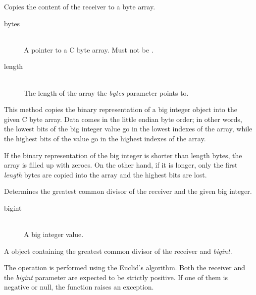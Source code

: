 
Copies the content of the receiver to a byte array.


\docparams

\begin{description}
\item[bytes] \hfill \\ A pointer to a C byte array. Must not be .
\item[length] \hfill \\ The length of the array the \emph{bytes} parameter points to.
\end{description}

\docdiscuss

This method copies the binary representation of a big integer object into the given C byte array. Data comes in the little endian byte order; in other words, the lowest bits of the big integer value go in the lowest indexes of the array, while the highest bits of the value go in the highest indexes of the array.

If the binary representation of the big integer is shorter than length bytes, the array is filled up with zeroes. On the other hand, if it is longer, only the first \emph{length} bytes are copied into the array and the highest bits are lost.



Determines the greatest common divisor of the receiver and the given big integer.


\docparams

\begin{description}
\item[bigint] \hfill \\ A big integer value.
\end{description}

\docretval

A  object containing the greatest common divisor of the receiver and \emph{bigint}.

\docdiscuss

The operation is performed using the Euclid's algorithm. Both the receiver and the \emph{bigint} parameter are expected to be strictly positive. If one of them is negative or null, the function raises an exception.

